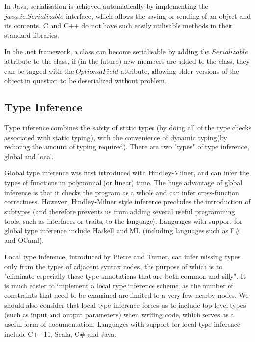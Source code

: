 \documentclass[11pt,a4paper]{report}
\begin{document}
In Java, serialisation is achieved automatically by implementing the $java.io.Serializable$ \cite{java-serializable} interface, which allows the saving or sending of an object and its contents.
C and C++ do not have such easily utilisable methods in their standard libraries.

In the .net framework, a class can become serialisable by adding the $Serializable$\cite{net-serializable} attribute to the class, if (in the future) new members are added to the class, they can be tagged with the $OptionalField$ attribute\cite{net-optional}, allowing older versions of the object in question to be deserialized without problem.

\subsection{Type Inference}

Type inference\cite{damas-milner} combines the safety of static types\cite{palsberg199419} (by doing all of the type checks associated with static typing), with the convenience of dynamic typing\cite{Abadi:1991:DTS:103135.103138}(by reducing the amount of typing required).
There are two "types" of type inference, global and local.

Global type inference was first introduced with Hindley-Milner\cite{hindley-milner}, and can infer the types of functions in polynomial (or linear) time.
The huge advantage of global inference is that it checks the program as a whole and can infer cross-function correctness.
However, Hindley-Milner style inference precludes the introduction of subtypes\cite{Mitchell:1984:CTI:800017.800529} (and therefore prevents us from adding several useful programming tools, such as interfaces or traits, to the language).
Languages with support for global type inference include Haskell and ML (including languages such as F\# and OCaml).

Local type inference, introduced by Pierce and Turner\cite{pierce1997local}, can infer missing types only from the types of adjacent syntax nodes\cite{hosoya1999good}, the purpose of which is to "eliminate especially those type annotations that are both common and silly"\cite{pierce2000local}.
It is much easier to implement a local type inference scheme, as the number of constraints that need to be examined are limited to a very few nearby nodes.
We should also consider that local type inference forces us to include top-level types (such as input and output parameters) when writing code, which serves as a useful form of documentation\cite{pierce2000local}.
Languages with support for local type inference include C++11, Scala, C\# and Java.
\end{document}
